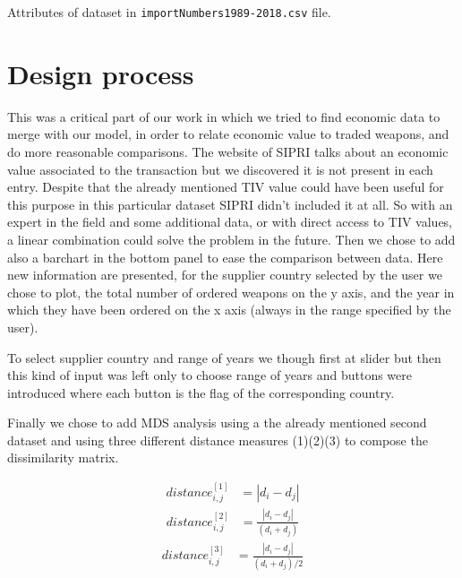 \documentclass{article}
\begin{document}
\begin{multicols}{2}
\begin{center}
\begin{table}[hbt!]
\caption { \label { tab:d2} Attributes of dataset in \texttt{importNumbers1989-2018.csv} file.   }

\end{table}


\end{center}


\section{Design process}
%

This was a critical part of our work in which we tried to find economic data to merge with our model, in order to relate economic value to traded weapons, and do more reasonable comparisons. The website of SIPRI talks about an economic value associated to the transaction but we discovered it is not present in each entry. Despite that the already mentioned TIV value could have been useful for this purpose in this particular dataset SIPRI didn’t included it at all. So with an expert in the field and some additional data, or with direct access to TIV values, a linear combination could solve the problem in the future.
Then we chose to add also a barchart in the bottom panel to ease the comparison between data. Here new information are presented, for the supplier country selected by the user we chose to plot, the total number of ordered weapons on the y axis, and the year in which they have been ordered on the x axis (always in the range specified by the user).

To select supplier country and range of years we though first at slider but then this kind of input was left only to choose range of years and buttons were introduced where each button is the flag of the corresponding country. 

Finally we chose to add MDS analysis using a the already mentioned second dataset and using three different distance measures (1)(2)(3) to compose the dissimilarity matrix.

\begin{align}
    distance_{i,j}^{[1]} &= | d_i-d_j | \label{eq:distance 1}
\end{align}
\begin{align}
    distance_{i,j}^{[2]} &= \frac{|d_i-d_j|}{(d_i+d_j)}\label{eq:distance 1}
\end{align}
\begin{align}
    distance_{i,j}^{[3]} &= \frac{|d_i-d_j|}{(d_i+d_j)/2} \label{eq:distance 1}
\end{align}



\end{multicols}
\end{document}

